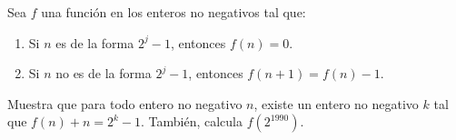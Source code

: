 Sea $f$ una función en los enteros no negativos tal que:
\begin{enumerate} 
 \item  Si $n$ es de la forma $2^j-1$, entonces $f(n)=0$.
 \item  Si $n$ no es de la forma $2^j-1$, entonces $f(n+1)=f(n)-1$.
 \end{enumerate} 
Muestra que para todo entero no negativo $n$, existe un entero no negativo $k$ tal que $f(n)+n=2^k-1$. También, calcula $f(2^{1990})$.